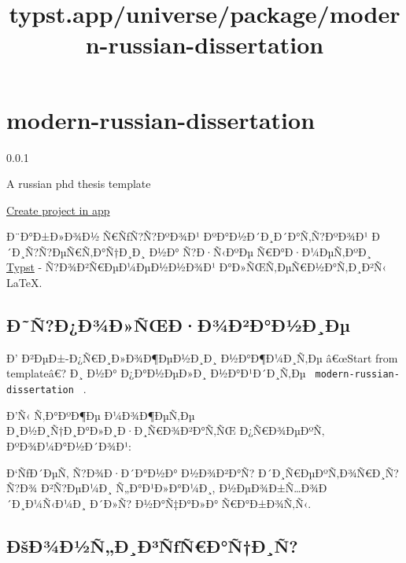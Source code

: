 \title{typst.app/universe/package/modern-russian-dissertation}

\label{banner}
\label{template-thumbnail}

\section{modern-russian-dissertation}\label{modern-russian-dissertation}

{ 0.0.1 }

A russian phd thesis template

\href{/app?template=modern-russian-dissertation&version=0.0.1}{Create
project in app}

\label{readme}
Ð¨Ð°Ð±Ð»Ð¾Ð½ Ñ€ÑƒÑ?Ñ?ÐºÐ¾Ð¹ ÐºÐ°Ð½Ð´Ð¸Ð´Ð°Ñ‚Ñ?ÐºÐ¾Ð¹
Ð´Ð¸Ñ?Ñ?ÐµÑ€Ñ‚Ð°Ñ†Ð¸Ð¸ Ð½Ð° Ñ?Ð·Ñ‹ÐºÐµ Ñ€Ð°Ð·Ð¼ÐµÑ‚ÐºÐ¸
\href{https://typst.app/}{Typst} - Ñ?Ð¾Ð²Ñ€ÐµÐ¼ÐµÐ½Ð½Ð¾Ð¹
Ð°Ð»ÑŒÑ‚ÐµÑ€Ð½Ð°Ñ‚Ð¸Ð²Ñ‹ LaTeX.

\subsection{Ð˜Ñ?Ð¿Ð¾Ð»ÑŒÐ·Ð¾Ð²Ð°Ð½Ð¸Ðµ}\label{uxf0uxf1uxf0uxf0uxbeuxf0uxf1ux153uxf0uxf0uxbeuxf0uxb2uxf0uxf0uxbduxf0uxf0uxb5}

Ð' Ð²ÐµÐ±-Ð¿Ñ€Ð¸Ð»Ð¾Ð¶ÐµÐ½Ð¸Ð¸ Ð½Ð°Ð¶Ð¼Ð¸Ñ‚Ðµ â€œStart from templateâ€?
Ð¸ Ð½Ð° Ð¿Ð°Ð½ÐµÐ»Ð¸ Ð½Ð°Ð¹Ð´Ð¸Ñ‚Ðµ
\texttt{\ modern-russian-dissertation\ } .

Ð'Ñ‹ Ñ‚Ð°ÐºÐ¶Ðµ Ð¼Ð¾Ð¶ÐµÑ‚Ðµ Ð¸Ð½Ð¸Ñ†Ð¸Ð°Ð»Ð¸Ð·Ð¸Ñ€Ð¾Ð²Ð°Ñ‚ÑŒ
Ð¿Ñ€Ð¾ÐµÐºÑ‚ ÐºÐ¾Ð¼Ð°Ð½Ð´Ð¾Ð¹:

\begin{Shaded}
\begin{Highlighting}[]
\end{Highlighting}
\end{Shaded}

Ð`ÑƒÐ´ÐµÑ‚ Ñ?Ð¾Ð·Ð´Ð°Ð½Ð° Ð½Ð¾Ð²Ð°Ñ? Ð´Ð¸Ñ€ÐµÐºÑ‚Ð¾Ñ€Ð¸Ñ? Ñ?Ð¾
Ð²Ñ?ÐµÐ¼Ð¸ Ñ„Ð°Ð¹Ð»Ð°Ð¼Ð¸, Ð½ÐµÐ¾Ð±Ñ\ldots Ð¾Ð´Ð¸Ð¼Ñ‹Ð¼Ð¸ Ð´Ð»Ñ?
Ð½Ð°Ñ‡Ð°Ð»Ð° Ñ€Ð°Ð±Ð¾Ñ‚Ñ‹.

\subsection{ÐšÐ¾Ð½Ñ„Ð¸Ð³ÑƒÑ€Ð°Ñ†Ð¸Ñ?}\label{uxf0ux161uxf0uxbeuxf0uxbduxf1uxf0uxf0uxb3uxf1ux192uxf1uxf0uxf1uxf0uxf1}

